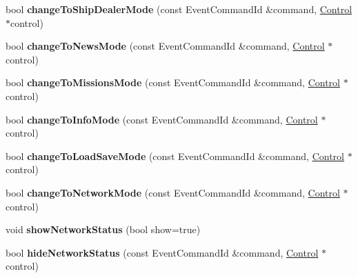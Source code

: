 \begin{DoxyCompactItemize}
\item 
bool {\bfseries change\+To\+Ship\+Dealer\+Mode} (const Event\+Command\+Id \&command, \hyperlink{classControl}{Control} $\ast$control)\hypertarget{classBaseComputer_ace1f19cc0fa070b4dcda744eb47af304}{}\label{classBaseComputer_ace1f19cc0fa070b4dcda744eb47af304}

\item 
bool {\bfseries change\+To\+News\+Mode} (const Event\+Command\+Id \&command, \hyperlink{classControl}{Control} $\ast$control)\hypertarget{classBaseComputer_a48030ef509e2062080b5d28630a0d100}{}\label{classBaseComputer_a48030ef509e2062080b5d28630a0d100}

\item 
bool {\bfseries change\+To\+Missions\+Mode} (const Event\+Command\+Id \&command, \hyperlink{classControl}{Control} $\ast$control)\hypertarget{classBaseComputer_a4adc22a8464e3132c81adc35cd246337}{}\label{classBaseComputer_a4adc22a8464e3132c81adc35cd246337}

\item 
bool {\bfseries change\+To\+Info\+Mode} (const Event\+Command\+Id \&command, \hyperlink{classControl}{Control} $\ast$control)\hypertarget{classBaseComputer_a24894bbfc883d2ab1c49fc11ca23cdc8}{}\label{classBaseComputer_a24894bbfc883d2ab1c49fc11ca23cdc8}

\item 
bool {\bfseries change\+To\+Load\+Save\+Mode} (const Event\+Command\+Id \&command, \hyperlink{classControl}{Control} $\ast$control)\hypertarget{classBaseComputer_a3f3597bd8c98b4eabf9a92d28609a89e}{}\label{classBaseComputer_a3f3597bd8c98b4eabf9a92d28609a89e}

\item 
bool {\bfseries change\+To\+Network\+Mode} (const Event\+Command\+Id \&command, \hyperlink{classControl}{Control} $\ast$control)\hypertarget{classBaseComputer_a08dbbfd13945c886705a0b45066a9d4a}{}\label{classBaseComputer_a08dbbfd13945c886705a0b45066a9d4a}

\item 
void {\bfseries show\+Network\+Status} (bool show=true)\hypertarget{classBaseComputer_a5b7b516dae3c591fa59d058f2a0acdf4}{}\label{classBaseComputer_a5b7b516dae3c591fa59d058f2a0acdf4}

\item 
bool {\bfseries hide\+Network\+Status} (const Event\+Command\+Id \&command, \hyperlink{classControl}{Control} $\ast$control)\hypertarget{classBaseComputer_a9b9fbad335800145aa255025b7dcad57}{}\label{classBaseComputer_a9b9fbad335800145aa255025b7dcad57}


\end{DoxyCompactItemize}
